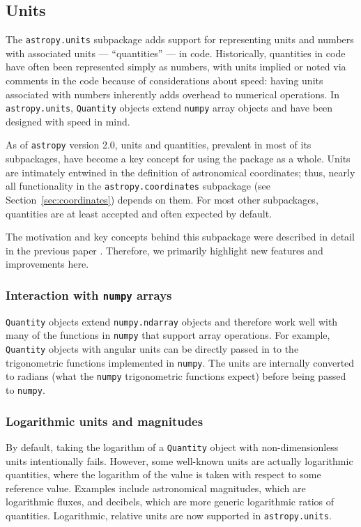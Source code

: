 \documentclass[modern]{aastex61}
\newcommand{\package}[1]{\texttt{#1}\xspace}
\newcommand{\astropypkg}{\package{astropy}}
\newcommand{\sectionname}{Section\xspace}
\begin{document}
\subsection{Units}\label{sec:units}

The \texttt{astropy.units} subpackage adds support for representing units and
numbers with associated units --- ``quantities'' --- in code.
Historically, quantities in code have often been represented simply as numbers,
with units implied or noted via comments in the code because of considerations
about speed: having units associated with numbers inherently adds overhead to
numerical operations.
In \texttt{astropy.units}, \texttt{Quantity} objects extend \texttt{numpy}
array objects and have been designed with speed in mind.

As of \astropypkg version 2.0, units and quantities, prevalent in most of its
subpackages, have become a key concept for using the package as a whole.
Units are intimately entwined in the definition of astronomical coordinates;
thus, nearly all functionality in the \texttt{astropy.coordinates} subpackage
(see \sectionname~\ref{sec:coordinates}) depends on them.
For most other subpackages, quantities are at least accepted and often expected
by default.

The motivation and key concepts behind this subpackage were described in detail
in the previous paper \citep{astropy}. Therefore, we primarily highlight new
features and improvements here.

\subsubsection{Interaction with \package{numpy} arrays}

\texttt{Quantity} objects extend
\texttt{numpy.ndarray} objects and therefore
work well with many of the functions in \texttt{numpy} that support
array operations. For example, \texttt{Quantity} objects with angular
units can be directly passed in to the trigonometric functions implemented in
\texttt{numpy}. The units are internally converted to radians (what the \texttt{numpy}
trigonometric functions expect) before being passed to \texttt{numpy}.

\subsubsection{Logarithmic units and magnitudes}
        By default, taking the logarithm of
        a \texttt{Quantity} object with non-dimensionless units intentionally
        fails.
        However, some well-known units are actually logarithmic quantities,
        where the logarithm of the value is taken with respect to some reference
        value.
        Examples include astronomical magnitudes, which are logarithmic fluxes,
        and decibels, which are more generic logarithmic ratios of quantities.
        Logarithmic, relative units are now supported in \texttt{astropy.units}.
\end{document}
